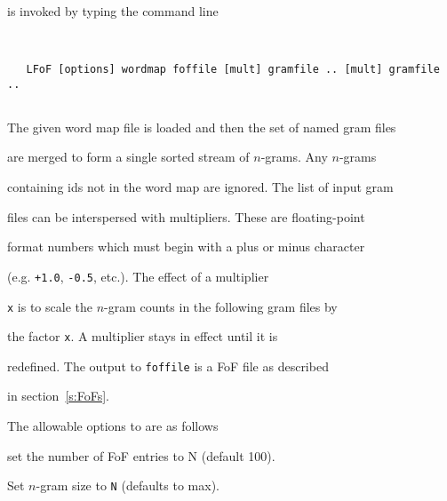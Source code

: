 




 is invoked by typing the command line


\begin{verbatim}


   LFoF [options] wordmap foffile [mult] gramfile .. [mult] gramfile ..


\end{verbatim}


The given word map file is loaded and then the set of named gram files


are merged to form a single sorted stream of $n$-grams. Any $n$-grams


containing ids not in the word map are ignored. The list of input gram


files can be interspersed with multipliers. These are floating-point


format numbers which must begin with a plus or minus character


(e.g. \texttt{+1.0}, \texttt{-0.5}, etc.). The effect of a multiplier


\texttt{x} is to scale the $n$-gram counts in the following gram files by


the factor \texttt{x}.  A multiplier stays in effect until it is


redefined.  The output to \texttt{foffile} is a FoF file as described


in section~\ref{s:FoFs}.





The allowable options to  are as follows





\begin{optlist}


   set the number of FoF entries to N (default 100).


   Set $n$-gram size to \texttt{N} (defaults to max).


\end{optlist}















